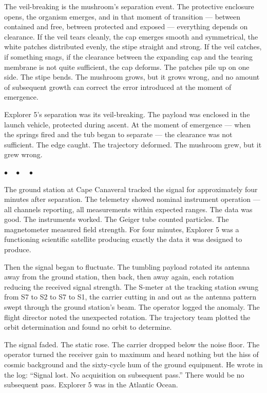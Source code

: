 \documentclass[12pt, letterpaper]{article}
\begin{document}
The veil-breaking is the mushroom's separation event. The protective enclosure opens, the organism emerges, and in that moment of transition --- between contained and free, between protected and exposed --- everything depends on clearance. If the veil tears cleanly, the cap emerges smooth and symmetrical, the white patches distributed evenly, the stipe straight and strong. If the veil catches, if something snags, if the clearance between the expanding cap and the tearing membrane is not quite sufficient, the cap deforms. The patches pile up on one side. The stipe bends. The mushroom grows, but it grows wrong, and no amount of subsequent growth can correct the error introduced at the moment of emergence.

Explorer 5's separation was its veil-breaking. The payload was enclosed in the launch vehicle, protected during ascent. At the moment of emergence --- when the springs fired and the tub began to separate --- the clearance was not sufficient. The edge caught. The trajectory deformed. The mushroom grew, but it grew wrong.

\begin{center}
$\bullet\quad\bullet\quad\bullet$
\end{center}

The ground station at Cape Canaveral tracked the signal for approximately four minutes after separation. The telemetry showed nominal instrument operation --- all channels reporting, all measurements within expected ranges. The data was good. The instruments worked. The Geiger tube counted particles. The magnetometer measured field strength. For four minutes, Explorer 5 was a functioning scientific satellite producing exactly the data it was designed to produce.

Then the signal began to fluctuate. The tumbling payload rotated its antenna away from the ground station, then back, then away again, each rotation reducing the received signal strength. The S-meter at the tracking station swung from S7 to S2 to S7 to S1, the carrier cutting in and out as the antenna pattern swept through the ground station's beam. The operator logged the anomaly. The flight director noted the unexpected rotation. The trajectory team plotted the orbit determination and found no orbit to determine.

The signal faded. The static rose. The carrier dropped below the noise floor. The operator turned the receiver gain to maximum and heard nothing but the hiss of cosmic background and the sixty-cycle hum of the ground equipment. He wrote in the log: ``Signal lost. No acquisition on subsequent pass.'' There would be no subsequent pass. Explorer 5 was in the Atlantic Ocean.
\end{document}
